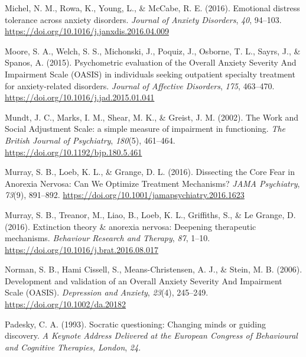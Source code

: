 \documentclass[
  man,floatsintext]{apa7}
\newlength{\cslhangindent}
\newlength{\cslentryspacingunit} %
\newenvironment{CSLReferences}[2] %
 {%
  \setlength{\parindent}{0pt}
  \ifodd #1
  \let\oldpar\par
  \def\par{\hangindent=\cslhangindent\oldpar}
  \fi
  \setlength{\parskip}{#2\cslentryspacingunit}
 }%
 {}
\begin{document}
\begin{CSLReferences}{1}{0}
\leavevmode{}%
Michel, N. M., Rowa, K., Young, L., \& McCabe, R. E. (2016). Emotional distress tolerance across anxiety disorders. \emph{Journal of Anxiety Disorders}, \emph{40}, 94--103. \url{https://doi.org/10.1016/j.janxdis.2016.04.009}

\leavevmode{}%
Moore, S. A., Welch, S. S., Michonski, J., Poquiz, J., Osborne, T. L., Sayrs, J., \& Spanos, A. (2015). Psychometric evaluation of the Overall Anxiety Severity And Impairment Scale (OASIS) in individuals seeking outpatient specialty treatment for anxiety-related disorders. \emph{Journal of Affective Disorders}, \emph{175}, 463--470. \url{https://doi.org/10.1016/j.jad.2015.01.041}

\leavevmode{}%
Mundt, J. C., Marks, I. M., Shear, M. K., \& Greist, J. M. (2002). The Work and Social Adjustment Scale: a simple measure of impairment in functioning. \emph{The British Journal of Psychiatry}, \emph{180}(5), 461--464. \url{https://doi.org/10.1192/bjp.180.5.461}

\leavevmode{}%
Murray, S. B., Loeb, K. L., \& Grange, D. L. (2016). Dissecting the Core Fear in Anorexia Nervosa: Can We Optimize Treatment Mechanisms? \emph{JAMA Psychiatry}, \emph{73}(9), 891--892. \url{https://doi.org/10.1001/jamapsychiatry.2016.1623}

\leavevmode{}%
Murray, S. B., Treanor, M., Liao, B., Loeb, K. L., Griffiths, S., \& Le Grange, D. (2016). Extinction theory \& anorexia nervosa: Deepening therapeutic mechanisms. \emph{Behaviour Research and Therapy}, \emph{87}, 1--10. \url{https://doi.org/10.1016/j.brat.2016.08.017}

\leavevmode{}%
Norman, S. B., Hami Cissell, S., Means-Christensen, A. J., \& Stein, M. B. (2006). Development and validation of an Overall Anxiety Severity And Impairment Scale (OASIS). \emph{Depression and Anxiety}, \emph{23}(4), 245--249. \url{https://doi.org/10.1002/da.20182}

\leavevmode{}%
Padesky, C. A. (1993). Socratic questioning: Changing minds or guiding discovery. \emph{A Keynote Address Delivered at the European Congress of Behavioural and Cognitive Therapies, London}, \emph{24}.


\end{CSLReferences}
\end{document}
